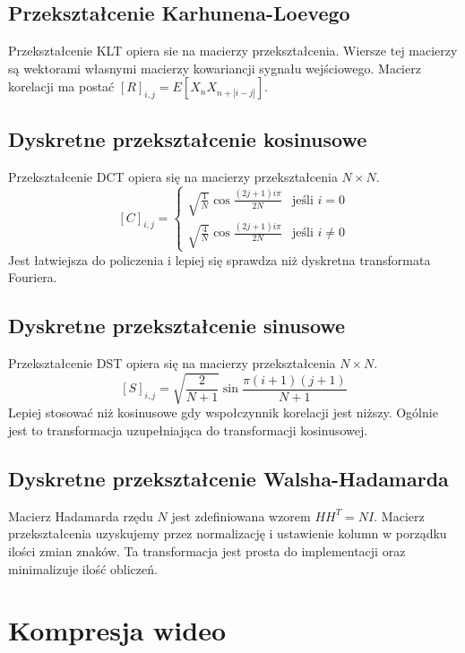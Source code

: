 \documentclass{../konspekt}
\begin{document}
\begin{multicols}{2}
  \subsection*{Przekształcenie Karhunena-Loevego}

  Przekształcenie KLT opiera sie na macierzy przekształcenia.
  Wiersze tej macierzy są wektorami własnymi macierzy kowariancji sygnału
  wejściowego. Macierz korelacji ma postać $[R]_{i,j} = E[X_nX_{n + |i - j|}]$.

  \subsection*{Dyskretne przekształcenie kosinusowe}

  Przekształcenie DCT opiera się na macierzy przekształcenia $N \times N$.
  $$
  [C]_{i,j} =
  \begin{cases}
    \sqrt{\frac{1}{N}} \cos \frac{(2j + 1)i\pi}{2N} & \text{jeśli } i = 0 \\
    \sqrt{\frac{4}{N}} \cos \frac{(2j + 1)i\pi}{2N} & \text{jeśli } i \neq 0
  \end{cases}
  $$
  Jest łatwiejsza do policzenia i lepiej się sprawdza niż dyskretna
  transformata Fouriera.

  \subsection*{Dyskretne przekształcenie sinusowe}

  Przekształcenie DST opiera się na macierzy przekształcenia $N \times N$.
  $$
  [S]_{i,j} = \sqrt{\frac{2}{N + 1}} \sin \frac{\pi(i + 1)(j + 1)}{N + 1}
  $$
  Lepiej stosować niż kosinusowe gdy wspołczynnik korelacji jest niższy.
  Ogólnie jest to transformacja uzupełniająca do transformacji kosinusowej.

  \subsection*{Dyskretne przekształcenie Walsha-Hadamarda}

  Macierz Hadamarda rzędu $N$ jest zdefiniowana wzorem $HH^T = NI$. Macierz
  przekształcenia uzyskujemy przez normalizację i ustawienie kolumn w porządku
  ilości zmian znaków. Ta transformacja jest prosta do implementacji oraz
  minimalizuje ilość obliczeń.

  \section*{Kompresja wideo}


\end{multicols}
\end{document}
